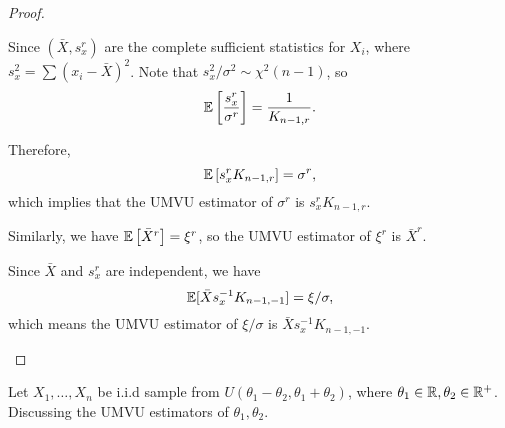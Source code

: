 \begin{proof}
\begin{enumerate}
		      Since \((\bar{X}, s_{x}^{r})\) are the complete sufficient statistics for \(X_{i}\), where \(s_{x}^{2} = \sum (x_{i} - \bar{X})^{2}\).
		      Note that \(s_x^2/\sigma^2 \sim \chi^2(n-1)\), so
		      \begin{equation*}
			      \mathbb{E}\left[\frac{s_x^r}{\sigma^r}\right] = \frac{1}{K_{n-1, r}}.
		      \end{equation*}

		      Therefore,
		      \begin{equation*}
			      \mathbb{E}\left[s_{x}^{r} K_{n-1, r}\right] = \sigma^r,
		      \end{equation*}
		      which implies that the UMVU estimator of \(\sigma^r\) is \(s_{x}^{r} K_{n-1, r}\).

		      Similarly, we have \(\mathbb{E}\left[\bar{X}^r\right] = \xi^r\), so the UMVU estimator of \(\xi^r\) is \(\bar{X}^r\).

		      Since \(\bar{X}\) and \(s_x^r\) are independent, we have
		      \begin{equation*}
			      \mathbb{E}[\bar{X} s_x^{-1} K_{n-1, -1}] = \xi / \sigma,
		      \end{equation*}
		      which means the UMVU estimator of \(\xi / \sigma\) is \(\bar{X} s_x^{-1} K_{n-1, -1}\).
	\end{enumerate}
\end{proof}

\begin{example}[]
	Let \(X_{1},\ldots,X_{n}\) be i.i.d sample from \(U\left(\theta_1-\theta_2,\theta_1+\theta_2\right)\), where \(\theta_1\in\mathbb{R},\theta_2\in\mathbb{R}^+\). Discussing the UMVU estimators of \(\theta_1,\theta_2\).
\end{example}

